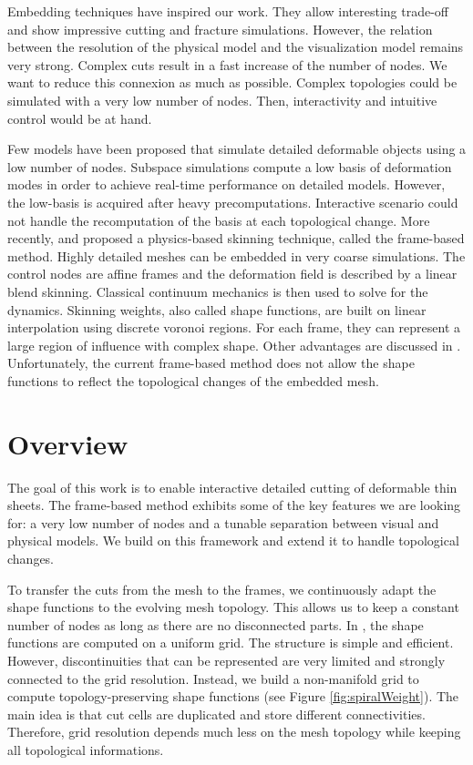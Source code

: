 Embedding techniques have inspired our work. They allow interesting trade-off and show impressive cutting and fracture simulations. However, the relation between the resolution of the physical model and the visualization model remains very strong. Complex cuts result in a fast increase of the number of nodes. We want to reduce this connexion as much as possible. Complex topologies could be simulated with a very low number of nodes. Then, interactivity and intuitive control would be at hand.

Few models have been proposed that simulate detailed deformable objects using a low number of nodes. Subspace simulations \cite{Barbic2005} compute a low basis of deformation modes in order to achieve real-time performance on detailed models. However, the low-basis is acquired after heavy precomputations. Interactive scenario could not handle the recomputation of the basis at each topological change. More recently, \cite{Gilles2011} and \cite{Faure2011} proposed a physics-based skinning technique, called the frame-based method. Highly detailed meshes can be embedded in very coarse simulations. The control nodes are affine frames and the deformation field is described by a linear blend skinning. Classical continuum mechanics is then used to solve for the dynamics. Skinning weights, also called shape functions, are built on linear interpolation using discrete voronoi regions. For each frame, they can represent a large region of influence with complex shape. Other advantages are discussed in \cite{Faure2011}. Unfortunately, the current frame-based method does not allow the shape functions to reflect the topological changes of the embedded mesh.

\section{Overview}

The goal of this work is to enable interactive detailed cutting of deformable thin sheets. The frame-based method exhibits some of the key features we are looking for: a very low number of nodes and a tunable separation between visual and physical models.  We build on this framework and extend it to handle topological changes.

To transfer the cuts from the mesh to the frames, we continuously adapt the shape functions to the evolving mesh topology. This allows us to keep a constant number of nodes as long as there are no disconnected parts. In \cite{Faure2011}, the shape functions are computed on a uniform grid. The structure is simple and efficient. However, discontinuities that can be represented are very limited and strongly connected to the grid resolution. Instead, we build a non-manifold grid to compute topology-preserving shape functions (see Figure \ref{fig:spiralWeight}). The main idea is that cut cells are duplicated and store different connectivities. Therefore, grid resolution depends much less on the mesh topology while keeping all topological informations.


